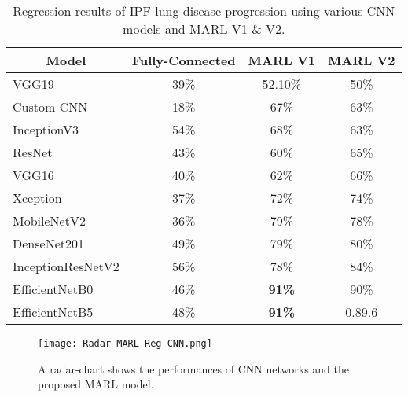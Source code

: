 \documentclass[conference]{IEEEtran}
\begin{document}
\begin{table}[]
\centering
\caption{Regression results of IPF lung disease progression using various CNN models and MARL V1 \& V2.}\label{reg}
\begin{tabular}{|l|c|c|c|}
\hline
\multicolumn{1}{|c|}{Model} & \multicolumn{1}{l|}{Fully-Connected} & \multicolumn{1}{l|}{\textbf{MARL V1}} & \multicolumn{1}{l|}{MARL V2} \\ \hline
VGG19 \cite{simonyan2014very} & 39\% & 52.10\% & 50\% \\ \hline
Custom CNN & 18\% & 67\% & 63\% \\ \hline
InceptionV3 \cite{szegedy2016rethinking} & 54\% & 68\% & 63\% \\ \hline
ResNet \cite{he2016deep} & 43\% & 60\% & 65\% \\ \hline
VGG16 \cite{simonyan2014very} & 40\% & 62\% & 66\% \\ \hline
Xception \cite{chollet2017xception} & 37\% & 72\% & 74\% \\ \hline
MobileNetV2 \cite{Sandler_2018_CVPR} & 36\% & 79\% & 78\% \\ \hline
DenseNet201 \cite{huang2017densely} & 49\% & 79\% & 80\% \\ \hline
InceptionResNetV2 \cite{szegedy2017inception} & 56\% & 78\% & 84\% \\ \hline
EfficientNetB0 \cite{tan2019efficientnet} & 46\% & \textbf{91\%} & 90\% \\ \hline
EfficientNetB5 \cite{tan2019efficientnet} & 48\% & \textbf{91\%} & 0.89.6 \\ \hline
\end{tabular}
\end{table}

\begin{figure}
    \centering
    \texttt{[image: Radar-MARL-Reg-CNN.png]}
    \caption{A radar-chart shows the performances of CNN networks and the proposed MARL model.}
    \label{Radar-MARL-Reg-CNN}
\end{figure}
%
\end{document}
